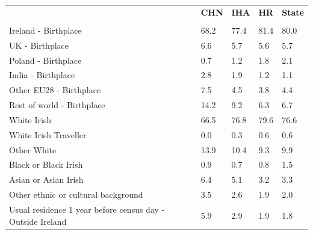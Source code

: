 \documentclass{article}
\begin{document}
\pagebreak
\begin{table}[h]	
\centering
		\begin{tabular}{KTTTT}
  \hline
& \textbf{CHN} & \textbf{IHA} & \textbf{HR}& \textbf{State}\\ 
  \hline
    \\ 
    \hline
Ireland - Birthplace & 68.2& 77.4& 81.4& 80.0\\
UK - Birthplace & 6.6& 5.7& 5.6& 5.7\\
Poland - Birthplace & 0.7& 1.2& 1.8& 2.1\\
India - Birthplace & 2.8& 1.9& 1.2& 1.1\\
Other EU28 - Birthplace & 7.5& 4.5& 3.8& 4.4\\
Rest of world - Birthplace & 14.2&  9.2&  6.3&  6.7\\
    \hline
White Irish & 66.5& 76.8& 79.6& 76.6\\
White Irish Traveller & 0.0& 0.3& 0.6& 0.6\\
Other White & 13.9& 10.4&  9.3&  9.9\\
Black or Black Irish & 0.9& 0.7& 0.8& 1.5\\
Asian or Asian Irish & 6.4& 5.1& 3.2& 3.3\\
Other ethnic or cultural background & 3.5& 2.6& 1.9& 2.0\\
    \hline
Usual residence 1 year before census day - Outside Ireland & 5.9& 2.9& 1.9& 1.8\\


\end{tabular}
\end{table}
\end{document}
